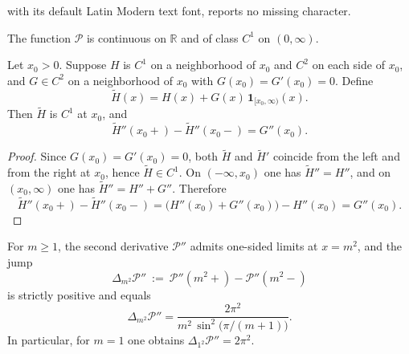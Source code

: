 \documentclass[10pt,a4paper]{amsart}
\newcommand{\R}{\mathbb{R}}
\begin{document}
with its default Latin Modern text font, reports no missing character.
\begin{proposition}\label{prop:C1}
The function $\mathcal{P}$ is continuous on $\R$ and of class $C^1$ on $(0,\infty)$.
\end{proposition}

\begin{lemma}\label{lem:heaviside-junction}
Let $x_0>0$. Suppose $H$ is $C^1$ on a neighborhood of $x_0$ and $C^2$ on each side of $x_0$, and $G\in C^2$ on a neighborhood of $x_0$ with $G(x_0)=G'(x_0)=0$. Define
\[
\widetilde H(x)=H(x)+G(x)\,\mathbf 1_{[x_0,\infty)}(x).
\]
Then $\widetilde H$ is $C^1$ at $x_0$, and
\[
\widetilde H''(x_0{+})-\widetilde H''(x_0{-})=G''(x_0).
\]

\begin{proof}
Since $G(x_0)=G'(x_0)=0$, both $\widetilde H$ and $\widetilde H'$ coincide from the left and from the right at $x_0$, hence $\widetilde H\in C^1$. On $(-\infty,x_0)$ one has $\widetilde H''=H''$, and on $(x_0,\infty)$ one has $\widetilde H''=H''+G''$. Therefore
\[
\widetilde H''(x_0{+})-\widetilde H''(x_0{-})=\bigl(H''(x_0)+G''(x_0)\bigr)-H''(x_0)=G''(x_0).
\]
\end{proof}
\end{lemma}

\begin{proposition}\label{prop:second}
For $m\ge1$, the second derivative $\mathcal P''$ admits one-sided limits at $x=m^2$, and the jump
\[
\Delta_{m^2}\mathcal P''\ :=\ \mathcal P''(m^2{+})-\mathcal P''(m^2{-})
\]
is strictly positive and equals
\[
\Delta_{m^2}\mathcal{P}''=\frac{2\pi^2}{m^2\,\sin^2\!\bigl(\pi/(m+1)\bigr)}.
\]
In particular, for $m=1$ one obtains $\Delta_{1^2}\mathcal P''=2\pi^2$.
\end{proposition}
\end{document}
